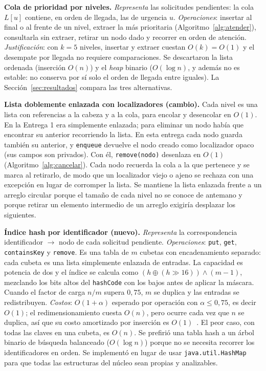 \textbf{Cola de prioridad por niveles.} \emph{Representa} las solicitudes
pendientes: la cola $L[u]$ contiene, en orden de llegada, las de urgencia
$u$. \emph{Operaciones}: insertar al final o al frente de un nivel, extraer
la más prioritaria (Algoritmo~\ref{alg:atender}), consultarla sin extraer,
retirar un nodo dado y recorrer en orden de atención. \emph{Justificación}:
con $k=5$ niveles, insertar y extraer cuestan $O(k)=O(1)$ y el desempate
por llegada no requiere comparaciones. Se descartaron la lista ordenada
(inserción $O(n)$) y el \emph{heap} binario ($O(\log n)$, y además no es
estable: no conserva por sí solo el orden de llegada entre iguales). La
Sección~\ref{sec:resultados} compara las tres alternativas.

\textbf{Lista doblemente enlazada con localizadores (cambio).} Cada nivel
es una lista con referencias a la cabeza y a la cola, para encolar y
desencolar en $O(1)$. En la Entrega 1 era simplemente enlazada; para
eliminar un nodo había que encontrar su anterior recorriendo la lista. En
esta entrega cada nodo guarda también su anterior, y \texttt{enqueue}
devuelve el nodo creado como localizador opaco (sus campos son privados).
Con él, \texttt{remove(nodo)} desenlaza en $O(1)$
(Algoritmo~\ref{alg:cancelar}). Cada nodo recuerda la cola a la que
pertenece y se marca al retirarlo, de modo que un localizador viejo o ajeno
se rechaza con una excepción en lugar de corromper la lista. Se mantiene
la lista enlazada frente a un arreglo circular porque el tamaño de cada
nivel no se conoce de antemano y porque retirar un elemento intermedio de
un arreglo exigiría desplazar los siguientes.

\textbf{Índice hash por identificador (nuevo).} \emph{Representa} la
correspondencia identificador $\to$ nodo de cada solicitud pendiente.
\emph{Operaciones}: \texttt{put}, \texttt{get}, \texttt{containsKey} y
\texttt{remove}. Es una tabla de $m$ cubetas con encadenamiento separado:
cada cubeta es una lista simplemente enlazada de entradas. La capacidad es
potencia de dos y el índice se calcula como
$(h \oplus (h \gg 16)) \land (m-1)$, mezclando los bits altos del
\texttt{hashCode} con los bajos antes de aplicar la máscara. Cuando el
factor de carga $n/m$ supera $0{,}75$, $m$ se duplica y las entradas se
redistribuyen. \emph{Costos}: $O(1+\alpha)$ esperado por operación con
$\alpha \le 0{,}75$, es decir $O(1)$; el redimensionamiento cuesta $O(n)$,
pero ocurre cada vez que $n$ se duplica, así que su costo amortizado por
inserción es $O(1)$~\cite{cormen}. El peor caso, con todas las claves en una
cubeta, es $O(n)$. Se prefirió una tabla hash a un árbol binario de
búsqueda balanceado ($O(\log n)$) porque no se necesita recorrer los
identificadores en orden. Se implementó en lugar de usar
\texttt{java.util.HashMap} para que todas las estructuras del núcleo sean
propias y analizables.

